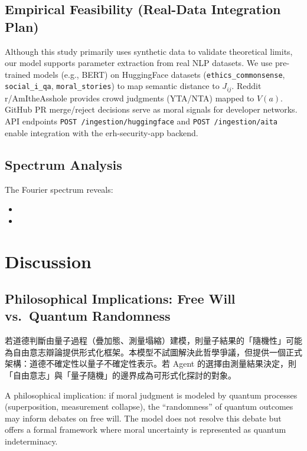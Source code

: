 \documentclass[12pt,a4paper]{article}
\theoremstyle{definition}
\theoremstyle{remark}
\begin{document}
\subsection{Empirical Feasibility (Real-Data Integration Plan)}
\label{sec:empirical}

Although this study primarily uses synthetic data to validate theoretical limits, our model supports parameter extraction from real NLP datasets. We use pre-trained models (e.g., BERT) on HuggingFace datasets (\texttt{ethics\_commonsense}, \texttt{social\_i\_qa}, \texttt{moral\_stories}) to map semantic distance to $J_{ij}$. Reddit r/AmItheAsshole provides crowd judgments (YTA/NTA) mapped to $V(a)$. GitHub PR merge/reject decisions serve as moral signals for developer networks. API endpoints \texttt{POST /ingestion/huggingface} and \texttt{POST /ingestion/aita} enable integration with the erh-security-app backend.

\subsection{Spectrum Analysis}

The Fourier spectrum reveals:
\begin{itemize}
    \item [Finding about periodic patterns]
    \item [Interpretation]
\end{itemize}

\section{Discussion}
\label{sec:discussion}

\subsection{Philosophical Implications: Free Will vs.\ Quantum Randomness}
\label{sec:free-will}

若道德判斷由量子過程（疊加態、測量塌縮）建模，則量子結果的「隨機性」可能為自由意志辯論提供形式化框架。本模型不試圖解決此哲學爭議，但提供一個正式架構：道德不確定性以量子不確定性表示。若 Agent 的選擇由測量結果決定，則「自由意志」與「量子隨機」的邊界成為可形式化探討的對象。

A philosophical implication: if moral judgment is modeled by quantum processes (superposition, measurement collapse), the ``randomness'' of quantum outcomes may inform debates on free will. The model does not resolve this debate but offers a formal framework where moral uncertainty is represented as quantum indeterminacy.
\end{document}
